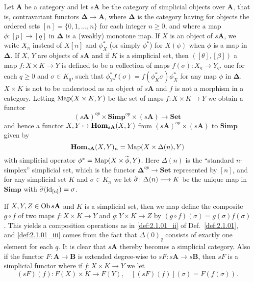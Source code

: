 \documentclass[../main]{subfiles}
\begin{document}
Let $\mathbf A$ be a category and let $s\mathbf A$ be the category of simplicial objects over $\mathbf A$, that is, contravariant functors $\mathbf \Delta \longrightarrow \mathbf A$, %
where $\mathbf \Delta$ is the category having for objects the ordered sets $[n] = \{0, 1, \dots, n\}$ for each integer $n \geq 0$, and where a map $\phi \colon [p] \longrightarrow [q]$ in $\mathbf \Delta$ is a (weakly) monotone map. If $X$ is an object of $s\mathbf A$, we write $X_n$ instead of $X[n]$ and $\phi^*_X$ (or simply $\phi^*$) for $X(\phi)$ when $\phi$ is a map in $\mathbf \Delta$. If $X$, $Y$ are objects of $s\mathbf A$ and if $K$ is a simplicial set, then $([\theta], [\beta])$ %
a map $f \colon X \times K \longrightarrow Y$ is defined to be a collection of maps $f(\sigma) \colon X_q \longrightarrow Y_q$, one for each $q \geq 0$ and $\sigma \in K_q$, such that $\phi^*_Yf(\sigma) = f(\phi^*_K \sigma) \phi^*_X$ for any map $\phi$ in $\mathbf \Delta$. $X \times K$ is not to be understood as an object of $s\mathbf A$ and $f$ is not a morphism in a category. Letting $\operatorname{Map}(X \times K, Y)$ be the set of maps $f \colon X \times K \longrightarrow Y$ we obtain a functor \[(s\mathbf A)^{op} \times \mathbf{Simp}^{op}  \times (s \mathbf A) \longrightarrow \mathbf{Set}\] 
and hence a functor $X,Y \mapsto \operatorname{\mathbf{Hom}}_{s\mathbf A}(X, Y)$ from $(s\mathbf A)^{op} \times (s\mathbf A)$ to $\mathbf{Simp}$ given by \[\operatorname{\mathbf{Hom}}_{s\mathbf A} (X, Y)_n = \operatorname{Map}(X \times \Delta(n), Y)\] with simplicial operator $\phi^* = \Map(X \times \xtilde \phi, Y)$. Here $\Delta(n)$ is the ``standard $n$-simplex'' simplicial set, which is the functor $\mathbf \Delta^{op} \longrightarrow \mathbf{Set}$ represented by $[n]$, and for any simplicial set $K$ and $\sigma \in K_n$ we let $\xtilde \sigma \colon \Delta(n) \longrightarrow K$ be the unique map in $\mathbf{Simp}$ with $\xtilde \sigma(\id_{[n]}) = \sigma$.

If $X, Y, Z \in \operatorname{Ob} s\mathbf A$ and $K$ is a simplicial set, then we map define the composite $g \circ f$ of two maps $f \colon X \times K \longrightarrow Y$ and $g \colon Y \times K \longrightarrow Z$ by $(g \circ f)(\sigma) = g(\sigma) f(\sigma)$. This yields a composition operations as in \ref{def:2.1.01_ii} of Def.\ \ref{def:2.1.01}, and \ref{def:2.1.01_iii} comes from the fact that $\Delta(0)_q$ consists of exactly one element for each $q$. It is clear that $s\mathbf A$ thereby becomes a simplicial category. Also if the functor $F \colon \mathbf A \longrightarrow \mathbf B$ is extended degree-wise to $sF \colon s\mathbf A \longrightarrow s \mathbf B$, then $sF$ is a simplicial functor where if $f \colon X \times K \longrightarrow Y$ we let \[(sF)(f) \colon F(X) \times K \longrightarrow F(Y),\quad [(sF)(f)](\sigma) = F(f(\sigma)).\]
\end{document}
